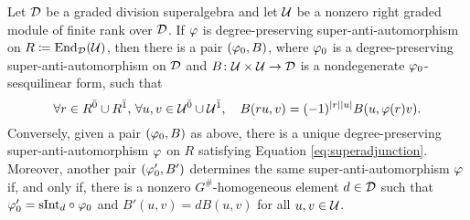 





\begin{thm}\label{thm:vphi-iff-vphi0-and-B}
    Let $\mathcal{D}$ be a graded division superalgebra and let $\mathcal U$ be a nonzero right graded module of finite rank over $\mathcal{D}$. 
    If $\varphi$ is degree-preserving super-anti-automorphism on $R \coloneqq \operatorname{End}_{\mathcal{D}}(\mathcal U)$, then there is a pair $(\varphi_0, B)$, where $\varphi_0$ is a degree-preserving super-anti-automorphism on $\mathcal{D}$ and $B\colon \mathcal U \times \mathcal U \to \mathcal{D}$ is a nondegenerate $\varphi_0$-sesquilinear form, such that
    \begin{equation}\label{eq:superadjunction}
        \forall r\in R^{\bar0} \cup R^{\bar1},\,\forall u, v \in \mathcal U^{\bar0} \cup \mathcal U^{\bar1},  \quad B(ru,v) = (-1)^{|r||u|} B(u,\varphi(r)v).
    \end{equation}
    Conversely, given a pair $(\varphi_0, B)$ as above, there is a unique degree-preserving super-anti-automorphism $\varphi$ on $R$ satisfying Equation \eqref{eq:superadjunction}. 
    Moreover, another pair $(\varphi_0', B')$ determines the same super-anti-automorphism $\varphi$ if, and only if, there is a nonzero $G^\#$-homogeneous element $d\in \mathcal{D}$ such that $\varphi_0' = \mathrm{sInt}_d \circ \varphi_0$ and $B'(u, v) = dB (u, v)$ for all $u, v \in \mathcal U$.
\end{thm}

